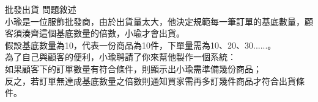 批發出貨
問題敘述\\
小瑜是一位服飾批發商，由於出貨量太大，他決定規範每一筆訂單的基底數量，顧客須湊齊這個基底數量的倍數，小瑜才會出貨。\\
假設基底數量為10，代表一份商品為10件，下單量需為10、20、30......。\\
為了自己與顧客的便利，小瑜聘請了你來幫他製作一個系統：\\
如果顧客下的訂單數量有符合條件，則顯示出小瑜需準備幾份商品；\\
反之，若訂單無達成基底數量之倍數則通知買家需再多訂幾件商品才符合出貨條件。\\
